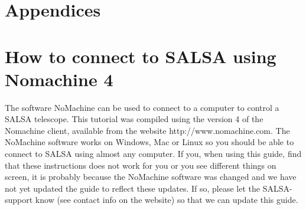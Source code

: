 \chapter*{Appendices}

\appendix

\chapter{How to connect to SALSA using Nomachine 4}
\label{app:nomachine}
The software NoMachine can be used to connect to a computer to control a SALSA
telescope.  This tutorial was compiled using the version 4 of the Nomachine
client, available from the website http://www.nomachine.com. The NoMachine
software works on Windows, Mac or Linux so you should be able to connect
to SALSA using almost any computer. If you, when using this guide, find that
these instructions does not work for you or you see different things on screen,
it is probably because the NoMachine software was changed and we have not yet updated
the guide to reflect these updates. If so, please let the SALSA-support know (see
contact info on the website) so that we can update this guide. 

